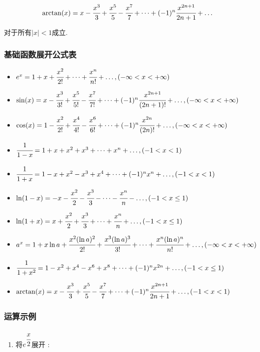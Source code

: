 \documentclass[UTF8,12pt]{ctexbook}
\newcommand{\absoluteValue}[1]{\left\lvert #1 \right\vert}
\begin{document}
{{{{{\begin{enumerate}
{            $$
              \arctan(x) = x - \cfrac{x^3}{3} + \cfrac{x^5}{5} - \cfrac{x^7}{7} + \dots + (-1)^n\cfrac{x^{2n + 1}}{2n + 1} + \dots
            $$

            对于所有$\absoluteValue{x} < 1$成立.
            }
    \end{enumerate}
  }%

  \subsubsection{基础函数展开公式表}{
    \begin{itemize}
      \item $e^x = 1 + x + \cfrac{x^2}{2!} + \dots + \cfrac{x^n}{n!} + \dots,(-\infty < x < +\infty)$
      \item $\sin(x) = x - \cfrac{x^3}{3!} + \cfrac{x^5}{5!} - \cfrac{x^7}{7!} + \dots + (-1)^n\cfrac{x^{2n + 1}}{(2n + 1)!} + \dots,(-\infty < x < +\infty)$
      \item $\cos(x) = 1 - \cfrac{x^2}{2!} + \cfrac{x^4}{4!} - \cfrac{x^6}{6!} + \dots + (-1)^n\cfrac{x^{2n}}{(2n)!} + \dots,(-\infty < x < +\infty)$
      \item $\cfrac{1}{1 - x} = 1 + x + x^2 + x^3 + \dots + x^n + \dots,(-1 < x < 1)$
      \item $\cfrac{1}{1 + x} = 1 - x + x^2 - x^3 + x^4 + \dots + (-1)^nx^n + \dots,(-1 < x < 1)$
      \item $\ln(1 - x) = -x - \cfrac{x^2}{2} - \cfrac{x^3}{3} - \dots - \cfrac{x^n}{n} - \dots,(-1 < x \leq 1)$
      \item $\ln(1 + x) = x + \cfrac{x^2}{2} + \cfrac{x^3}{3} + \dots + \cfrac{x^n}{n} + \dots,(-1 < x \leq 1)$
      \item $a^x = 1 + x\ln a + \cfrac{x^2(\ln a)^2}{2!} + \cfrac{x^3(\ln a)^3}{3!} + \dots + \cfrac{x^n(\ln a)^n}{n!} + \dots,(-\infty < x < +\infty)$
      \item $\cfrac{1}{1 + x^2} = 1 - x^2 + x^4 - x^6 + x^8 + \dots + (-1)^nx^{2n} + \dots,(-1 < x \leq 1)$
      \item $\arctan(x) = x - \cfrac{x^3}{3} + \cfrac{x^5}{5} - \cfrac{x^7}{7} + \dots + (-1)^n\cfrac{x^{2n + 1}}{2n + 1} + \dots,(-1 < x < 1)$
    \end{itemize}
  }%

  \subsubsection{运算示例}{
    \begin{enumerate}
      \item {
            将$e^{\cfrac{x}{2}}$展开 :

}
\end{enumerate}}}}}}
\end{document}
